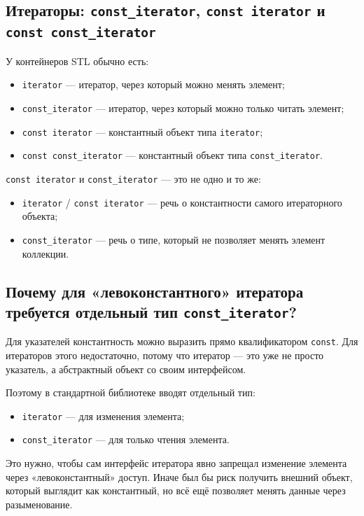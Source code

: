\subsection{Итераторы: \texttt{const\_iterator}, \texttt{const iterator} и \texttt{const const\_iterator}}
У контейнеров STL обычно есть:
\begin{itemize}
    \item \texttt{iterator} — итератор, через который можно менять элемент;
    \item \texttt{const\_iterator} — итератор, через который можно только читать элемент;
    \item \texttt{const iterator} — константный объект типа \texttt{iterator};
    \item \texttt{const const\_iterator} — константный объект типа \texttt{const\_iterator}.
\end{itemize}

\begin{remark}
\texttt{const iterator} и \texttt{const\_iterator} — это не одно и то же:
\begin{itemize}
    \item \texttt{iterator} / \texttt{const iterator} — речь о константности самого итераторного объекта;
    \item \texttt{const\_iterator} — речь о типе, который не позволяет менять элемент коллекции.
\end{itemize}
\end{remark}

\subsection{Почему для «левоконстантного» итератора требуется отдельный тип \texttt{const\_iterator}?}
Для указателей константность можно выразить прямо квалификатором \texttt{const}.  
Для итераторов этого недостаточно, потому что итератор — это уже не просто указатель, а абстрактный объект со своим интерфейсом.

Поэтому в стандартной библиотеке вводят отдельный тип:
\begin{itemize}
    \item \texttt{iterator} — для изменения элемента;
    \item \texttt{const\_iterator} — для только чтения элемента.
\end{itemize}

\begin{remark}
Это нужно, чтобы сам интерфейс итератора явно запрещал изменение элемента через «левоконстантный» доступ. Иначе был бы риск получить внешний объект, который выглядит как константный, но всё ещё позволяет менять данные через разыменование.
\end{remark}

